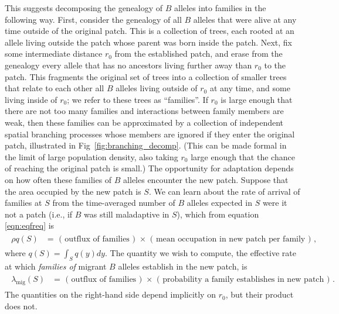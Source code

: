 \documentclass[10pt,letterpaper]{article}
\newcommand{\migrate}{\lambda_\text{mig}}
\begin{document}
This suggests decomposing the genealogy of $B$ alleles into families in the following way.
First, consider the genealogy of all $B$ alleles that were alive at any time outside of the original patch.  
This is a collection of trees, each rooted at an allele living outside the patch whose parent was born inside the patch.
Next, fix some intermediate distance $r_0$ from the established patch,
and erase from the genealogy every allele that has no ancestors living further away than $r_0$ to the patch.
This fragments the original set of trees into a collection of smaller trees that relate to each other all $B$ alleles living outside of $r_0$ at any time,
and some living inside of $r_0$;
we refer to these trees as ``families''.
If $r_0$ is large enough that there are not too many families
and interactions between family members are weak,
then these families can be approximated 
by a collection of independent spatial branching processes
whose members are ignored if they enter the original patch,
illustrated in Fig~\ref{fig:branching_decomp}.
(This can be made formal in the limit of large population density, also taking $r_0$ large enough that the chance of reaching the original patch is small.)
The opportunity for adaptation depends on how often these families of $B$ alleles encounter the new patch.
Suppose that the area occupied by the new patch is $S$.
We can learn about the rate of arrival of families at $S$ from
the time-averaged number of $B$ alleles expected in $S$ were it not a patch
(i.e., if $B$ was still maladaptive in $S$),
which from equation \eqref{eqn:eqfreq}
is 
\begin{align}
    \label{eqn:gestalt_q}
    \begin{split}
        \rho q(S) &= \text{ ( outflux of families ) } \times \text{ ( mean occupation in new patch per family ) } ,
\end{split}
\end{align}
where $q(S) = \int_S q(y) dy$.
The quantity we wish to compute,
the effective rate at which \emph{families of} migrant $B$ alleles establish in the new patch,
is
\begin{align}
    \label{eqn:gestalt_migrate}
    \begin{split}
        \migrate(S) &= \text{ ( outflux of families ) } \times \text{ ( probability a family establishes in new patch ) } .
    \end{split}
\end{align}
The quantities on the right-hand side depend implicitly on $r_0$,
but their product does not.
\end{document}
